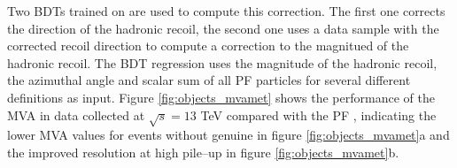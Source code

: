 Two \ac{BDTs} trained on \Zmm  are used to compute this correction.
The first one corrects the direction of the hadronic recoil, the second
one uses a data sample with the corrected recoil direction to compute a correction
to the magnitued of the hadronic recoil. The BDT regression uses the magnitude of the hadronic
recoil, the azimuthal angle and scalar \pT sum of all \ac{PF} particles for several 
different \MET definitions \cite{cms-met-run1} as input. Figure \ref{fig:objects_mvamet} shows
the performance of the MVA \MET in data collected at $\sqrt{s}=13$ TeV compared with 
the \ac{PF} \MET, indicating the lower MVA \MET values for events without genuine
\MET in figure \ref{fig:objects_mvamet}a and the improved resolution at high pile--up
in figure \ref{fig:objects_mvamet}b. 

\begin{figure}
\begin{center}

\end{center}
\end{figure}
